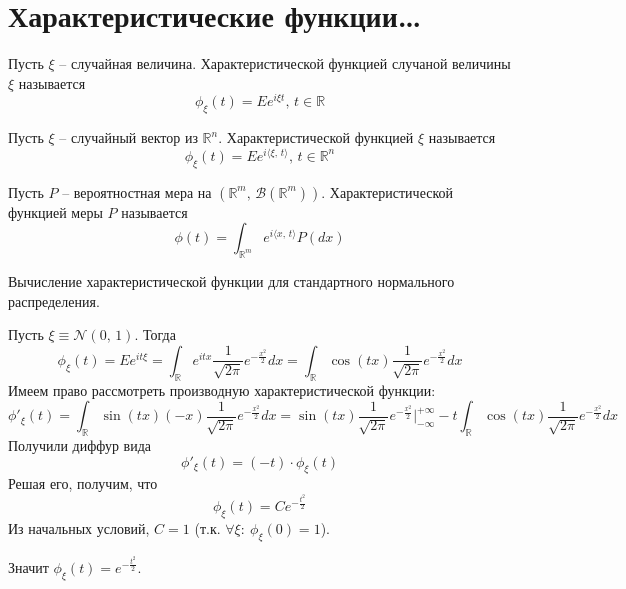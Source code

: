 \section{Характеристические функции\dots}
\begin{definition}
	Пусть $\xi$ -- случайная величина. Характеристической функцией случаной величины $\xi$ называется
	\[\phi_\xi(t) = Ee^{i\xi t},\, t \in \mathbb{R}\]
\end{definition}

\begin{definition}
	Пусть $\xi$ -- случайный вектор из $\mathbb{R}^n$. Характеристической функцией $\xi$ называется
	\[\phi_\xi(t) = Ee^{i\langle\xi,\,t\rangle},\, t \in \mathbb{R}^n\]
\end{definition}

\begin{definition}
	Пусть $P$ -- вероятностная мера на $(\mathbb{R}^m,\, \mathcal{B}(\mathbb{R}^m))$. Характеристической функцией меры $P$ называется
	\[\phi(t) = \int_{\mathbb{R}^m}e^{i\langle x,\, t\rangle}P(dx)\]
\end{definition}

\begin{example}
	Вычисление характеристической функции для стандартного нормального распределения.

	Пусть $\xi \equiv \mathcal{N}(0,\, 1)$. Тогда
	\[\phi_\xi(t) = Ee^{it\xi} = \int_\mathbb{R}e^{itx}\frac{1}{\sqrt{2\pi}}e^{-\frac{x^2}{2}}dx = \int_\mathbb{R}\cos(tx)\frac{1}{\sqrt{2\pi}}e^{-\frac{x^2}{2}}dx\]
	Имеем право рассмотреть производную характеристической функции:
	\[\phi'_\xi(t) = \int_\mathbb{R} \sin(tx)(-x)\frac{1}{\sqrt{2\pi}}e^{-\frac{x^2}{2}}dx = \sin(tx)\frac{1}{\sqrt{2\pi}}e^{-\frac{x^2}{2}}|_{-\infty}^{+\infty} - t\int_\mathbb{R}\cos(tx)\frac{1}{\sqrt{2\pi}}e^{-\frac{x^2}{2}}dx\]
	Получили диффур вида
	\[\phi'_\xi(t) = (-t) \cdot \phi_\xi(t)\]
	Решая его, получим, что
	\[\phi_\xi(t) = Ce^{-\frac{t^2}{2}}\]
	Из начальных условий, $C = 1$ (т.к. $\forall \xi:\: \phi_\xi(0) = 1$).

	Значит $\phi_\xi(t) = e^{-\frac{t^2}{2}}$.
\end{example}

